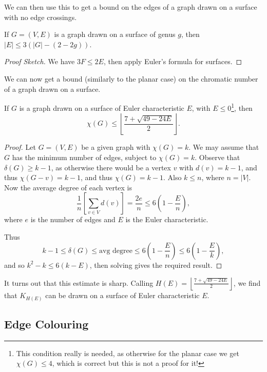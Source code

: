 \documentclass[a4paper]{scrartcl}
\begin{document}
We can then use this to get a bound on the edges of a graph drawn on a surface with no edge crossings.

\begin{proposition}
	If $G = (V, E)$ is a graph drawn on a surface of genus $g$, then $|E| \leq 3(|G| - (2 - 2g))$.
\end{proposition}
\begin{proof}[Proof Sketch]
	We have $3F \leq 2E$, then apply Euler's formula for surfaces.
\end{proof}

We can now get a bound (similarly to the planar case) on the chromatic number of a graph drawn on a surface.

\begin{theorem}
	If $G$ is a graph drawn on a surface of Euler characteristic $E$, with $E \leq 0$\footnote{This condition really is needed, as otherwise for the planar case we get $\chi(G) \leq 4$, which is correct but this is not a proof for it!}, then
	$$
	\chi(G) \leq \left\lfloor \frac{7 + \sqrt{49 - 24E}}{2}\right\rfloor.
	$$
\end{theorem}
\begin{proof}
	Let $G = (V, E)$ be a given graph with $\chi(G) = k$. We may assume that $G$ has the minimum number of edges, subject to $\chi(G) = k$.
	Observe that $\delta(G) \geq k - 1$, as otherwise there would be a vertex $v$ with $d(v) = k - 1$, and thus $\chi(G - v) = k - 1$, and thus $\chi(G) = k - 1$. Also $k \leq n$, where $n = |V|$. Now the average degree of each vertex is
	$$
	\frac{1}{n} \left[\sum_{v \in V}d(v)\right] = \frac{2e}{n} \leq 6\left(1 - \frac{E}{n}\right),
	$$
	where $e$ is the number of edges and $E$ is the Euler characteristic.

	Thus
	$$
	k - 1 \leq \delta(G) \leq \text{avg degree} \leq 6\left(1 - \frac{E}{n}\right) \leq 6\left(1 - \frac{E}{k}\right),
	$$
	and so $k^2 - k \leq 6(k - E)$, then solving gives the required result.
\end{proof}

\begin{remark}
	It turns out that this estimate is sharp. Calling $H(E) = \left\lfloor \frac{7 + \sqrt{49 - 24E}}{2}\right\rfloor$, we find that $K_{H(E)}$ can be drawn on a surface of Euler characteristic $E$.
\end{remark}

\subsection{Edge Colouring}
\end{document}
